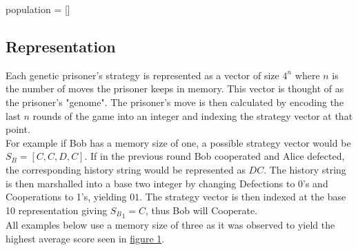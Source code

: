 \documentclass[12pt]{article}
\begin{document}
\begin{algorithm}[H]
 population = [] \;
\end{algorithm}

\subsection{Representation}
Each genetic prisoner's strategy is represented as a vector of size
$4^n$ where $n$ is the number of moves the prisoner keeps in memory.  This vector
is thought of as the prisoner's "genome".
The prisoner's move is then calculated by encoding the last $n$ rounds of the game
into an integer and indexing the strategy vector at that point. \\

For example if Bob has
a memory size of one, a possible strategy vector would be
$S_B = [C, C, D, C]$.  If in the previous round Bob cooperated and Alice defected,
the corresponding history string would be represented as $DC$.
The history string is then
marshalled into a base two integer by changing Defections to 0's and Cooperations
to 1's, yielding $01$.  The strategy vector is then indexed at the base
10 representation giving ${S_B}_1 = C$, thus Bob will Cooperate. \\

All examples below use a memory size of three as it was observed to yield the
highest average score seen in \hyperref[fig1]{figure 1}.
\end{document}
